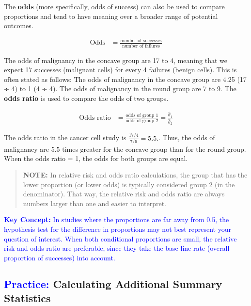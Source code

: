 \documentclass[
]{report}
\begin{document}
The \textbf{odds} (more specifically, odds of success) can also be used to compare proportions and tend to have meaning over a broader range of potential outcomes.

\begin{align}\label{5.5}
\text{Odds} &= \frac{\text{number of successes}}{\text{number of failures}} \tag{5.5}
\end{align}

The odds of malignancy in the concave group are 17 to 4, meaning that we expect 17 successes (malignant cells) for every 4 failures (benign cells). This is often stated as follows: The odds of malignancy in the concave group are 4.25 (17 ÷ 4) to 1 (4 ÷ 4). The odds of malignancy in the round group are 7 to 9. The \textbf{odds ratio} is used to compare the odds of two groups.

\begin{align}\label{5.6}
\text{Odds ratio} &= \frac{\text{odds of group 1}}{\text{odds of group 2}} = \frac{\hat\theta_1}{\hat\theta_2} \tag{5.6}
\end{align}

The odds ratio in the cancer cell study is \(\frac{17/4}{7/9} = 5.5.\). Thus, the odds of malignancy are 5.5 times greater for the concave group than for the round group. When the odds ratio = 1, the odds for both groups are equal.

\begin{quote}
\textbf{NOTE:} In relative risk and odds ratio calculations, the group that has the lower proportion (or lower odds) is typically considered group 2 (in the denominator). That way, the relative risk and odds ratio are always numbers larger than one and easier to interpret.
\end{quote}

\textbf{\textcolor{blue}{Key Concept:}} \textcolor{blue}{In studies where the proportions are far away from 0.5, the hypothesis test for the difference in proportions may not best represent your question of interest. When both conditional proportions are small, the relative risk and odds ratio are preferable, since they take the base line rate (overall proportion of successes) into account.}

\hypertarget{calculating-additional-summary-statistics}{%
\subsection*{\texorpdfstring{\textcolor{blue}{Practice:} Calculating Additional Summary Statistics}{ Calculating Additional Summary Statistics}}\label{calculating-additional-summary-statistics}}
\end{document}
